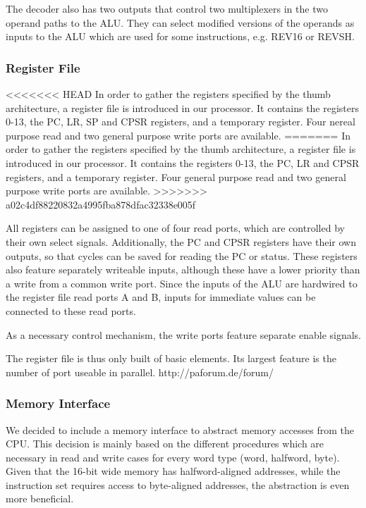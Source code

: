 The decoder also has two outputs that control two multiplexers in the two operand paths to the ALU. They can select modified versions of the operands as inputs to the ALU which are used for some instructions, e.g. REV16 or REVSH.

\subsubsection{Register File}
\label{subsubsec:regfisterfile}
<<<<<<< HEAD
In order to gather the registers specified by the thumb architecture, a register file is introduced in our processor. It contains the registers 0-13, the PC, LR, SP and CPSR registers, and a temporary register. Four nereal purpose read and two general purpose write ports are available.
=======
In order to gather the registers specified by the thumb architecture, a register file is introduced in our processor. It contains the registers 0-13, the PC, LR and CPSR registers, and a temporary register. Four general purpose read and two general purpose write ports are available.
>>>>>>> a02c4df88220832a4995fba878dfac32338e005f

All registers can be assigned to one of four read ports, which are controlled by their own select signals. Additionally, the PC and CPSR registers have their own outputs, so that cycles can be saved for reading the PC or status. These registers also feature separately writeable inputs, although these have a lower priority than a write from a common write port.
Since the inputs of the ALU are hardwired to the register file read ports A and B, inputs for immediate values can be connected to these read ports.

As a necessary control mechanism, the write ports feature separate enable signals.

The register file is thus only built of basic elements. Its largest feature is the number of port useable in parallel. 
http://paforum.de/forum/
\subsubsection{Memory Interface}
\label{subsubsec:memoryinterface}
We decided to include a memory interface to abstract memory accesses from the CPU. This decision is mainly based on the different procedures which are necessary in read and write cases for every word type (word, halfword, byte). Given that the 16-bit wide memory has halfword-aligned addresses, while the instruction set requires access to byte-aligned addresses, the abstraction is even more beneficial. 

